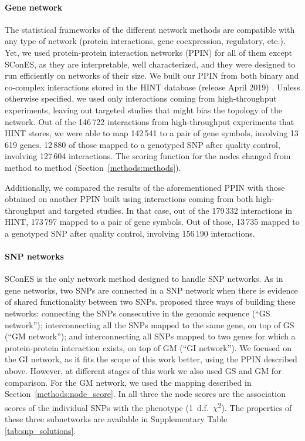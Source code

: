 \documentclass[draft,twocolumn, 11pt]{article}
\begin{document}
\paragraph{Gene network}
The statistical frameworks of the different network methods are compatible with any type of network (protein interactions, gene coexpression, regulatory, etc.). Yet, we used protein-protein interaction networks (PPIN) for all of them except SConES, as they are interpretable, well characterized, and they were designed to run efficiently on networks of their size. We built our PPIN from both binary and co-complex interactions stored in the HINT database (release April 2019) \cite{das_hint:_2012}. Unless otherwise specified, we used only interactions coming from high-throughput experiments, leaving out targeted studies that might bias the topology of the network. Out of the 146\,722 interactions from high-throughput experiments that HINT stores, we were able to map 142\,541 to a pair of gene symbols, involving 13\,619 genes. 12\,880 of those mapped to a genotyped SNP after quality control, involving 127\,604 interactions. The scoring function for the nodes changed from method to method (Section~\ref{methods:methods}).

Additionally, we compared the results of the aforementioned PPIN with those obtained on another PPIN built using interactions coming from both high-throughput and targeted studies. In that case, out of the 179\,332 interactions in HINT, 173\,797 mapped to a pair of gene symbols. Out of those, 13\,735 mapped to a genotyped SNP after quality control, involving 156\,190 interactions.

\paragraph{SNP networks}
SConES \cite{azencott_efficient_2013} is the only network method designed to handle SNP networks. As in gene networks, two SNPs are connected in a SNP network when there is evidence of shared functionality between two SNPs. \citet{azencott_efficient_2013} proposed three ways of building these networks: connecting the SNPs consecutive in the genomic sequence (``GS network''); interconnecting all the SNPs mapped to the same gene, on top of GS (``GM network''); and interconnecting all SNPs mapped to two genes for which a protein-protein interaction exists, on top of GM (``GI network''). We focused on the GI network, as it fits the scope of this work better, using the PPIN described above. However, at different stages of this work we also used GS and GM for comparison. For the GM network, we used the mapping described in Section~\ref{methods:node_score}. In all three the node scores are the association scores of the individual SNPs with the phenotype (1~d.f.~\(\chi\)\textsuperscript{2}). The properties of these three subnetworks are available in Supplementary Table \ref{tab:snp_solutions}.
\end{document}
